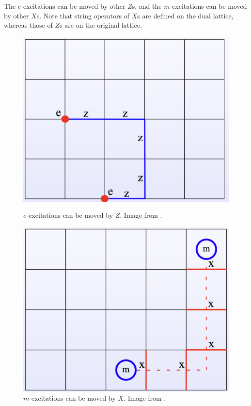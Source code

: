 \documentclass{ltjsarticle}
\theoremstyle{mystyle} %
\numberwithin{equation}{section}
\begin{document}
 The $e$-excitations can be moved by other $Z$s, 
 and the $m$-excitations can be moved by other $X$s. 
 Note that string operators of $X$s are defined on the dual lattice, 
 whereas those of $Z$s are on the original lattice. 
 \begin{figure}[tbp]
 \begin{minipage}[b]{0.48\columnwidth}
 \centering
 \includegraphics[width=\columnwidth]{e-move.png}
 \caption{$e$-excitations can be moved by $Z$. Image from \cite{DXN}. }
 \end{minipage}
 \hspace{0.04\columnwidth} %
 \begin{minipage}[b]{0.48\columnwidth}
 \centering
 \includegraphics[width=\columnwidth]{m-move.png}
 \caption{$m$-excitations can be moved by $X$. Image from \cite{DXN}. }
 \end{minipage}
 \end{figure}
\end{document}
